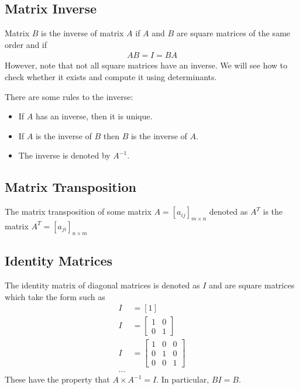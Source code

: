 \documentclass[a4paper]{article}
\theoremstyle{plain}
\theoremstyle{definition}
\newtheorem{defn}{Definition}[section]
\theoremstyle{remark}
\begin{document}
\subsection{Matrix Inverse}
\begin{tcolorbox}[colback=black!3!white,colframe=black!60!white,title=\begin{defn}Inverse \label{Inverse}\end{defn}]
Matrix $B$ is the inverse of matrix $A$ if $A$ and $B$ are square matrices of the same order and if
\begin{align}
AB = I = BA
\end{align}
However, note that not all square matrices have an inverse. We will see how to check whether it exists and compute it using determinants.
\end{tcolorbox}
There are some rules to the inverse:
\begin{itemize}
	\item If $A$ has an inverse, then it is unique.
	\item If $A$ is the inverse of $B$ then $B$ is the inverse of $A$.
	\item The inverse is denoted by $A ^{-1}$.
\end{itemize}
\subsection{Matrix Transposition}
\begin{tcolorbox}[colback=black!3!white,colframe=black!60!white,title=\begin{defn}Matrix Transposition \label{Matrix Transposition}\end{defn}]
The matrix transposition of some matrix $A=[a_{ij}]_{m \times n}$ denoted as $A^{T}$ is the matrix $A^{T}=[a_{ji}]_{n \times m}$
\end{tcolorbox}
\subsection{Identity Matrices}
\begin{tcolorbox}[colback=black!3!white,colframe=black!60!white,title=\begin{defn}Identity Matrices \label{Identity Matrices}\end{defn}]
The identity matrix of diagonal matrices is denoted as $I$ and are square matrices which take the form such as
\begin{align}
	I &= [1] \\
	I &= \begin{bmatrix} 1 & 0 \\
0 & 1\end{bmatrix} \\
		I &= \begin{bmatrix} 1 & 0 & 0\\
0 & 1 & 0 \\
0 & 0 & 1\end{bmatrix} \\
\ldots
\end{align}
These have the property that $A \times A^{-1}= I$. In particular, $BI = B$.
\end{tcolorbox}
\end{document}
